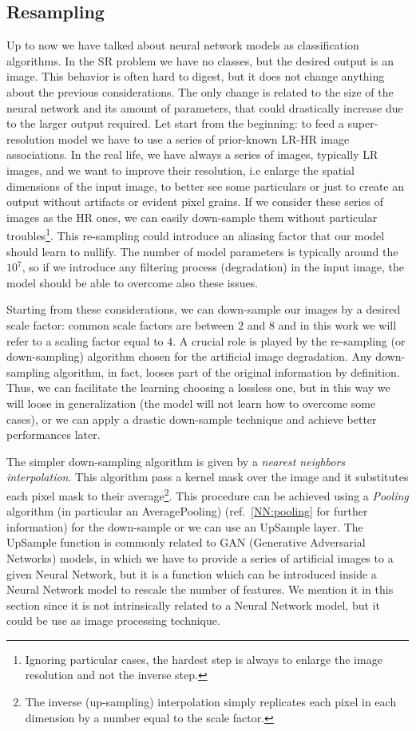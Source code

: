 \documentclass{standalone}
\begin{document}
\subsection[Resampling]{Resampling}\label{SR:downsampling}

Up to now we have talked about neural network models as classification algorithms.
In the SR problem we have no classes, but the desired output is an image.
This behavior is often hard to digest, but it does not change anything about the previous considerations.
The only change is related to the size of the neural network and its amount of parameters, that could drastically increase due to the larger output required.
Let start from the beginning: to feed a super-resolution model we have to use a series of prior-known LR-HR image associations.
In the real life, we have always a series of images, typically LR images, and we want to improve their resolution, i.e enlarge the spatial dimensions of the input image, to better see some particulars or just to create an output without artifacts or evident pixel grains.
If we consider these series of images as the HR ones, we can easily down-sample them without particular troubles\footnote{
  Ignoring particular cases, the hardest step is always to enlarge the image resolution and not the inverse step.
}.
This re-sampling could introduce an aliasing factor that our model should learn to nullify.
The number of model parameters is typically around the $10^7$, so if we introduce any filtering process (degradation) in the input image, the model should be able to overcome also these issues.

Starting from these considerations, we can down-sample our images by a desired scale factor: common scale factors are between $2$ and $8$ and in this work we will refer to a scaling factor equal to $4$.
A crucial role is played by the re-sampling (or down-sampling) algorithm chosen for the artificial image degradation.
Any down-sampling algorithm, in fact, looses part of the original information by definition.
Thus, we can facilitate the learning choosing a lossless one, but in this way we will loose in generalization (the model will not learn how to overcome some cases), or we can apply a drastic down-sample technique and achieve better performances later.

The simpler down-sampling algorithm is given by a \emph{nearest neighbors interpolation}.
This algorithm pass a kernel mask over the image and it substitutes each pixel mask to their average\footnote{
  The inverse (up-sampling) interpolation simply replicates each pixel in each dimension by a number equal to the scale factor.
}.
This procedure can be achieved using a \emph{Pooling} algorithm (in particular an AveragePooling) (ref.~\ref{NN:pooling} for further information) for the down-sample or we can use an UpSample layer.
The UpSample function is commonly related to GAN (Generative Adversarial Networks) models, in which we have to provide a series of artificial images to a given Neural Network, but it is a function which can be introduced inside a Neural Network model to rescale the number of features.
We mention it in this section since it is not intrinsically related to a Neural Network model, but it could be use as image processing technique.
\end{document}
